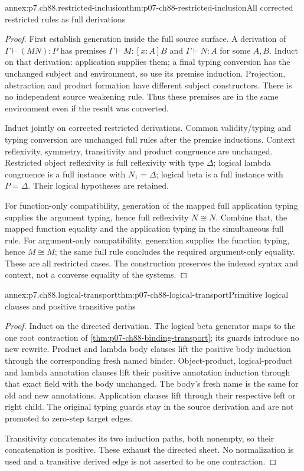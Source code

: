 \begin{annexitem}{annex:p7.ch88.restricted-inclusion}{thm:p07-ch88-restricted-inclusion}{All corrected restricted rules as full derivations}
\begin{proof}
First establish generation inside the full source surface. A derivation of \(\Gamma\vdash(MN):P\) has premises \(\Gamma\vdash M:[x:A]B\) and \(\Gamma\vdash N:A\) for some \(A,B\). Induct on that derivation: application supplies them; a final typing conversion has the unchanged subject and environment, so use its premise induction. Projection, abstraction and product formation have different subject constructors. There is no independent source weakening rule. Thus these premises are in the same environment even if the result was converted.

Induct jointly on corrected restricted derivations. Common validity/typing and typing conversion are unchanged full rules after the premise inductions. Context reflexivity, symmetry, transitivity and product congruence are unchanged. Restricted object reflexivity is full reflexivity with type \(\Delta\); logical lambda congruence is a full instance with \(N_1=\Delta\); logical beta is a full instance with \(P=\Delta\). Their logical hypotheses are retained.

For function-only compatibility, generation of the mapped full application typing supplies the argument typing, hence full reflexivity \(N\cong N\). Combine that, the mapped function equality and the application typing in the simultaneous full rule. For argument-only compatibility, generation supplies the function typing, hence \(M\cong M\); the same full rule concludes the required argument-only equality. These are all restricted cases. The construction preserves the indexed syntax and context, not a converse equality of the systems.
\end{proof}
\end{annexitem}

\begin{annexitem}{annex:p7.ch88.logical-transport}{thm:p07-ch88-logical-transport}{Primitive logical clauses and positive transitive paths}
\begin{proof}
Induct on the directed derivation. The logical beta generator maps to the one root contraction of \cref{thm:p07-ch88-binding-transport}; its guards introduce no new rewrite. Product and lambda body clauses lift the positive body induction through the corresponding fresh named binder. Object-product, logical-product and lambda annotation clauses lift their positive annotation induction through that exact field with the body unchanged. The body's fresh name is the same for old and new annotations. Application clauses lift through their respective left or right child. The original typing guards stay in the source derivation and are not promoted to zero-step target edges.

Transitivity concatenates its two induction paths, both nonempty, so their concatenation is positive. These exhaust the directed sheet. No normalization is used and a transitive derived edge is not asserted to be one contraction.
\end{proof}
\end{annexitem}

